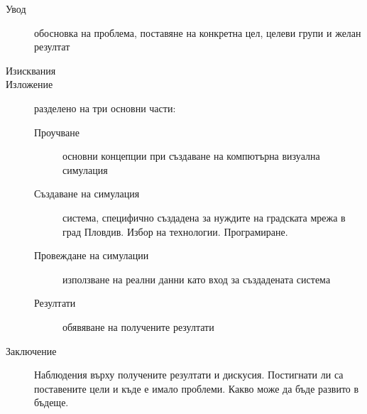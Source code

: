 \begin{description}

\item[Увод] обосновка на проблема, поставяне на конкретна цел, целеви групи и желан резултат

\item[Изисквания]

\item[Изложение] разделено на три основни части:

\begin{description}

\item[Проучване] основни концепции при създаване на компютърна визуална симулация
\item[Създаване на симулация] система, специфично създадена за нуждите на градската мрежа в град Пловдив. Избор на технологии. Програмиране.
\item[Провеждане на симулации] използване на реални данни като вход за създадената система
\item[Резултати] обявяване на получените резултати

\end{description}

\item[Заключение] Наблюдения върху получените резултати и дискусия. Постигнати ли са поставените цели и къде е имало проблеми. Какво може да бъде развито в бъдеще.
\end{description}